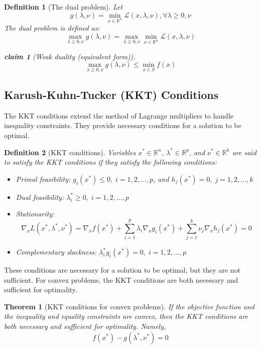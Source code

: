 \documentclass[11pt]{book} %
\newtheorem{theorem}{Theorem}[section]
\newtheorem{definition}{Definition}[section]
\newtheorem{claim}{claim}[section]
\begin{document}
\begin{definition}[The dual problem]
Let 
\[
  g(\lambda, \nu) = \min_{x \in \mathbb{R}^n} \mathcal{L}(x, \lambda, \nu),        \forall \lambda \geq 0, \nu  
\]
The dual problem is defined as:
\[
    \max_{\lambda \geq 0, \nu} g(\lambda, \nu) = \max_{\lambda \geq 0, \nu} \min_{x \in \mathbb{R}^n} \mathcal{L}(x, \lambda, \nu)
\]

\begin{claim}[Weak duality (equivalent form)]
\[
    \max_{\lambda \geq 0, \nu} g(\lambda, \nu) \leq \min_{x \in S} f(x)
\]
\end{claim}
\end{definition}

\subsection{Karush-Kuhn-Tucker (KKT) Conditions}

The KKT conditions extend the method of Lagrange multipliers to handle inequality constraints. 
They provide necessary conditions for a solution to be optimal. 
\begin{definition}[KKT conditions]

Variables \(x^* \in \mathbb{R}^n\), \(\lambda^* \in \mathbb{R}^p\), and \(\nu^* \in \mathbb{R}^k\) are said to satisfy the KKT conditions if they satisfy the following conditions:
\begin{itemize}
    \item Primal feasibility: \(g_i(x^*) \leq 0, \; i = 1, 2, \ldots, p\), and \(h_j(x^*) = 0, \; j = 1, 2, \ldots, k\)
    \item Dual feasibility: \(\lambda_i^* \geq 0, \; i = 1, 2, \ldots, p\)
    \item Stationarity: 
    \[ 
    \nabla_x L(x^*, \lambda^*, \nu^*) = \nabla_x f(x^*) + \sum_{i=1}^{p} \lambda_i \nabla_x g_i(x^*) + \sum_{j=1}^{k} \nu_j \nabla_x h_j(x^*) = 0
    \]
    \item Complementary slackness: \(\lambda_i^* g_i(x^*) = 0, \; i = 1, 2, \ldots, p\)
\end{itemize}
\end{definition}

These conditions are necessary for a solution to be optimal, but they are not sufficient.
For convex problems, the KKT conditions are both necessary and sufficient for optimality.

\begin{theorem}[KKT conditions for convex problems]
If the objective function and the inequality and equality constraints are convex, then the KKT conditions are both necessary and sufficient for optimality.
Namely, 
\[
  f(x^*) - g(\lambda^*, \nu^*) = 0  
\]
\end{theorem}
\end{document}
